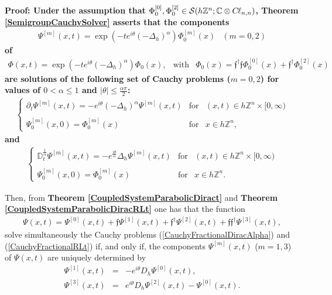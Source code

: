 \documentclass{elsarticle}
\newcommand{\BC}{{\mathbb C}}
\newcommand{\BZ}{{\mathbb Z}}
\newcommand{\f}{{\mathfrak f}}
\newcommand{\cl}{C \kern -0.1em \ell}
\newcommand{\proof}{\bf {Proof:} \rm}
\begin{document}
\proof Under the assumption that $\Phi^{[0]}_0,\Phi^{[2]}_0\in \mathcal{S}(h\BZ^n;\BC\otimes \cl_{n,n})$, {\bf Theorem \ref{SemigroupCauchySolver}} asserts that
the components 
\begin{eqnarray*}
	\Psi^{[m]}(x,t)=\exp\left(-te^{i\theta}(-\Delta_h)^\alpha\right)\Phi_0^{[m]}(x) & (m=0,2)
\end{eqnarray*}
of
\begin{eqnarray*}
	\Phi(x,t)=\exp\left(-te^{i\theta}(-\Delta_h)^\alpha\right)\Phi_0(x), &\mbox{with} & \Phi_0(x)=\f^\dagger\f\Phi^{[0]}_0(x)+\f^\dagger\Phi^{[2]}_0(x)
\end{eqnarray*}
are solutions of the following set of Cauchy problems ($m=0,2$) for values of $0<\alpha\leq 1$ and $|\theta|\leq \frac{\alpha \pi}{2}$:
\begin{eqnarray}
	\label{CauchySemidiscreteComponentsAlpha} \left\{\begin{array}{lll} 
		\partial_t\Psi^{[m]}(x,t)= -e^{i\theta}(-\Delta_h)^\alpha \Psi^{[m]}(x,t) & \mbox{for} & (x,t)\in
		h\BZ^n \times [0,\infty)
		\\ \ \\
		\Psi^{[m]}_0(x,0)=\Phi_0^{[m]}(x) & \mbox{for} & x\in h\BZ^n,
	\end{array}\right.
\end{eqnarray}
and \begin{eqnarray}
	\label{CauchySemidiscreteComponentsAlphaRL} \left\{\begin{array}{lll} 
		\mathbb{D}_t^{\frac{1}{\alpha}}\Psi^{[m]}(x,t)= -e^{ \frac{i\theta}{\alpha}}\Delta_h \Psi^{[m]}(x,t) & \mbox{for} & (x,t)\in
		h\BZ^n \times [0,\infty)
		\\ \ \\
		\Psi^{[m]}_0(x,0)=\Phi_0^{[m]}(x) & \mbox{for} & x\in h\BZ^n.
	\end{array}\right.
\end{eqnarray}

Then, from {\bf Theorem \ref{CoupledSystemParabolicDiract}} and {\bf Theorem \ref{CoupledSystemParabolicDiracRLt}} one has that the function 
\begin{eqnarray*}
	\Psi(x,t)=\Psi^{[0]}(x,t)+\f\Psi^{[1]}(x,t)+\f^\dagger\Psi^{[2]}(x,t)+\f\f^\dagger\Psi^{[3]}(x,t),
\end{eqnarray*}
solve simultaneously the Cauchy problems
(\ref{CauchyFractionalDiracAlpha}) and (\ref{CauchyFractionalRLt}) if, and only if, the components $\Psi^{[m]}(x,t)$ ($m=1,3$) of $\Psi(x,t)$ are uniquely determined by 
\begin{eqnarray*}
	\Psi^{[1]}(x,t)&=&-e^{i\theta}D_h\Psi^{[0]}(x,t), \\ \Psi^{[3]}(x,t)&=&e^{i\theta}D_h\Psi^{[2]}(x,t)-\Psi^{[0]}(x,t).
\end{eqnarray*}
\end{document}
